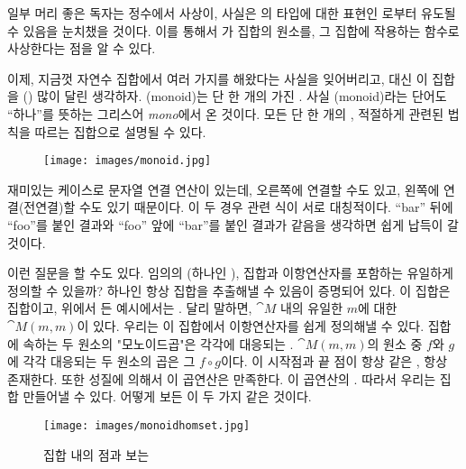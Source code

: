 일부 머리 좋은 독자는 정수에서 \trAdder{} 사상이, 사실은 의 타입에 대한 표현인 로부터 유도될 수 있음을 눈치챘을 것이다.
이를 통해서 가 \trMonoid 집합의 원소를, 그 집합에 작용하는 함수로 사상한다는 점을 알 수 있다.

이제, 지금껏 자연수 집합에서 여러 가지를 해왔다는 사실을 잊어버리고, 대신 이 집합을 \trMorphism\이(\trAdder\가) 많이 달린 \trObject{} 생각하자.
\trMonoid(monoid)는 단 한 개의 \trObject\를 가진 . 사실 \trMonoid(monoid)라는 단어도 ``하나''를 뜻하는 그리스어 \emph{mono}에서 온 것이다.
모든 \trMonoid\는 단 한 개의 \trObject\와, 적절하게  관련된 법칙을 따르는  집합으로 설명될 수 있다.

\begin{figure}[H]
\centering
\texttt{[image: images/monoid.jpg]}
\end{figure}

\noindent
재미있는 케이스로 문자열 연결 연산이 있는데, 오른쪽에 연결할 수도 있고, 왼쪽에 연결(전연결)할 수도 있기 때문이다.
이 두 경우 \trComposition 관련 식이 서로 대칭적이다.
``bar'' 뒤에 ``foo''를 붙인 결과와 ``foo'' 앞에 ``bar''를 붙인 결과가 같음을 생각하면 쉽게 납득이 갈 것이다.

이런 질문을 할 수도 있다. 임의의  \trMonoid(\trObject\가 하나인 \trCategory), 집합과 이항연산자를 포함하는 \trMonoid\를 유일하게 정의할 수 있을까?
\trObject\가 하나인  항상 집합을 추출해낼 수 있음이 증명되어 있다. 이 집합은  집합이고, 위에서 든 예시에서는 .
달리 말하면, \trCategory $\cat{M}$ 내의 유일한 \trObject $m$에 대한 \trHomSet $\cat{M}(m, m)$이 있다. 
우리는 이 집합에서 이항연산자를 쉽게 정의해낼 수 있다. 집합에 속하는 두 원소의 "모노이드곱"은 각각에 대응되는  \trComposition{}.
$\cat{M}(m, m)$의 원소 중 $f$와 $g$에 각각 대응되는 두 원소의 곱은 그  $f \circ g$이다.
이  시작점과 끝 점이 항상 같은 , \trComposition\은 항상 존재한다. %
또한  성질에 의해서 이 곱연산은 \trAssociativity\를 만족한다. \trIdentityMorphism\이 이 곱연산의 . 
따라서 우리는 \trCategory\trMonoid{} 집합 \trMonoid\를 만들어낼 수 있다. 어떻게 보든 이 두 가지 \trMonoid\는 같은 것이다.

\begin{figure}[H]
\centering
\texttt{[image: images/monoidhomset.jpg]}
\caption{집합 내의 점과 \trMorphism{} 보는 \trMonoid\trHomSet}
\end{figure}

